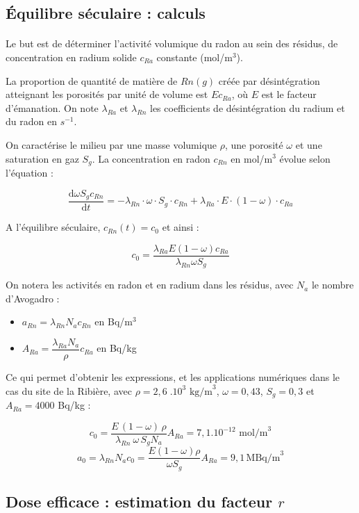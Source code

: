 \documentclass{article}
\begin{document}
\subsection{Équilibre séculaire : calculs }
\label{annexe:seculaire}

\paragraph{} Le but est de déterminer l'activité volumique du radon au sein des résidus, de concentration en radium solide $c_{Ra}$ constante (mol/m$^3$). 

La proportion de quantité de matière de $Rn(g)$ créée par désintégration atteignant les porosités par unité de volume est $E c_{Ra}$, où $E$ est le facteur d’émanation. On note $\lambda_{Ra}$ et $\lambda_{Rn}$ les coefficients de désintégration du radium et du radon en $s^{-1}$. 

On caractérise le milieu par une masse volumique $\rho$, une porosité $\omega$ et une saturation en gaz $S_g$. La concentration en radon $c_{Rn}$ en mol/m$^3$ évolue selon l'équation :

$$
\frac{\text{d} \omega S_g c_{Rn}}{\text{d}t} = - \lambda_{Rn}\cdot \omega\cdot S_g \cdot c_{Rn} + \lambda_{Ra} \cdot E \cdot(1-\omega)\cdot c_{Ra}
$$

A l'équilibre séculaire, $c_{Rn}(t)=c_0$ et ainsi :

$$
c_0 = \frac{ \lambda_{Ra} E (1-\omega) c_{Ra} }{\lambda_{Rn} \omega S_g}
$$

On notera les activités en radon et en radium dans les résidus, avec $N_a$ le nombre d'Avogadro :
\begin{itemize}
  \item $a_{Rn}= \lambda_{Rn} N_a c_{Rn}$ en Bq/m$^3$
  \item $A_{Ra}= \dfrac{\lambda_{Ra} N_a }{\rho} c_{Ra}$ en Bq/kg
\end{itemize}

Ce qui permet d'obtenir les expressions, et les applications numériques dans le cas du site de la Ribière, avec $\rho = 2,6 \;.10^3 \text{ kg/m}^3$, $\omega= 0,43$, $S_g=0,3$ et $A_{Ra}=4 000$ Bq/kg :

$$
c_0 = \dfrac{ E \,(1-\omega)\, \rho }{\lambda_{Rn}\: \omega \,S_g N_a} A_{Ra} = 7,1.10^{-12} \text{ mol/m}^3
$$
$$
a_0=\lambda_{Rn} N_a c_0 =\frac{E(1-\omega)\rho}{\omega S_g} A_{Ra} =9,1 \, \text{MBq/m}^3
$$

\subsection{Dose efficace : estimation du facteur $r$}
\label{annexe:estimation_r}
\end{document}
